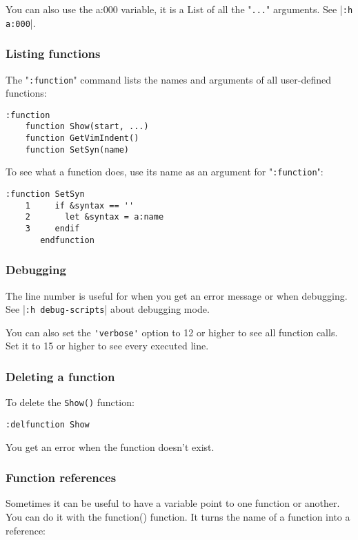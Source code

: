 You can also use the a:000 variable, it is a List of all the "\verb!...!" arguments.
See |\verb!:h a:000!|.

\subsubsection{Listing functions}
The "\verb!:function!" command lists the names and arguments of all user-defined
functions:

\begin{Verbatim}[samepage=true]
 :function
    function Show(start, ...)
    function GetVimIndent()
    function SetSyn(name)
\end{Verbatim}

To see what a function does, use its name as an argument for "\verb!:function!":

\begin{Verbatim}[samepage=true]
 :function SetSyn
    1     if &syntax == ''
    2       let &syntax = a:name
    3     endif
       endfunction
\end{Verbatim}

\subsubsection{Debugging}
The line number is useful for when you get an error message or when debugging.
See |\verb!:h debug-scripts!| about debugging mode.

You can also set the \verb!'verbose'! option to 12 or higher to see all function calls.
Set it to 15 or higher to see every executed line.

\subsubsection{Deleting a function}
To delete the \verb!Show()! function:

\begin{Verbatim}[samepage=true]
 :delfunction Show
\end{Verbatim}

You get an error when the function doesn't exist.

\subsubsection{Function references}
Sometimes it can be useful to have a variable point to one function or another.
You can do it with the function() function.
It turns the name of a function into a reference:

